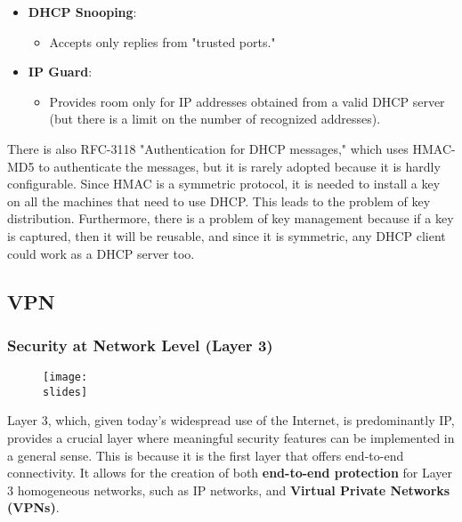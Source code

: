 \begin{itemize}
    \item \textbf{DHCP Snooping}:
          \begin{itemize}
              \item Accepts only replies from "trusted ports."
          \end{itemize}

    \item \textbf{IP Guard}:
          \begin{itemize}
              \item Provides room only for IP addresses obtained from a valid DHCP server (but there is a limit on the number of recognized addresses).
          \end{itemize}
\end{itemize}

There is also RFC-3118 "Authentication for DHCP messages," which uses HMAC-MD5 to authenticate the messages, but it is rarely adopted because it is hardly configurable. Since HMAC is a symmetric protocol, it is needed to install a key on all the machines that need to use DHCP. This leads to the problem of key distribution. Furthermore, there is a problem of key management because if a key is captured, then it will be reusable, and since it is symmetric, any DHCP client could work as a DHCP server too.


\subsection{VPN}
\subsubsection{Security at Network Level (Layer 3)}

\begin{figure}[h]
    \centering
    \texttt{[image: \\slides]}
\end{figure}

Layer 3, which, given today's widespread use of the Internet, is predominantly IP, provides a crucial layer where meaningful security features can be implemented in a general sense. This is because it is the first layer that offers end-to-end connectivity. It allows for the creation of both \textbf{end-to-end protection} for Layer 3 homogeneous networks, such as IP networks, and \textbf{Virtual Private Networks (VPNs)}.

